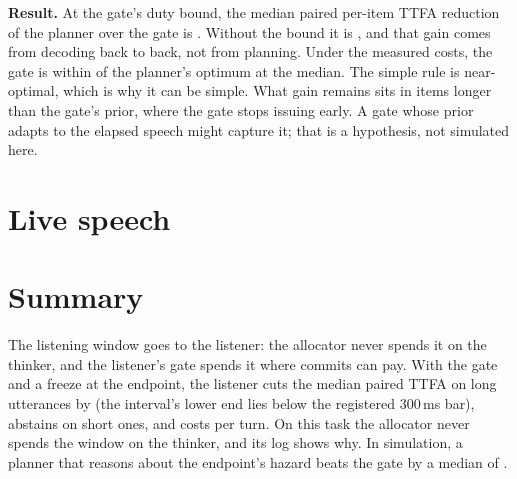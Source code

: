 \textbf{Result.} At the gate's duty bound, the median paired per-item TTFA
reduction of the planner over the gate is \PlannerDP. Without the bound it is
\PlannerNoDuty, and that gain comes from decoding back to back, not from
planning. Under the measured costs, the gate is within \PlannerDP{} of the
planner's optimum at the median. The simple rule is near-optimal, which is why
it can be simple. What gain remains sits in items longer than the gate's
prior, where the gate stops issuing early. A gate whose prior adapts to the
elapsed speech might capture it; that is a hypothesis, not simulated here.

\section{Live speech}
\label{sec:live}


\section{Summary}

The listening window goes to the listener: the allocator never spends it on
the thinker, and the listener's gate spends it where commits can pay. With the
gate and a freeze at the endpoint, the listener cuts the median paired TTFA on
long utterances by \PthreeRed{} (the interval's lower end lies below the registered 300\,ms bar), abstains on short ones, and costs
\EnergyListenerr{} per turn. On this task the allocator never spends the
window on the thinker, and its log shows why. In simulation, a planner that
reasons about the endpoint's hazard beats the gate by a median of
\PlannerDP{}.
